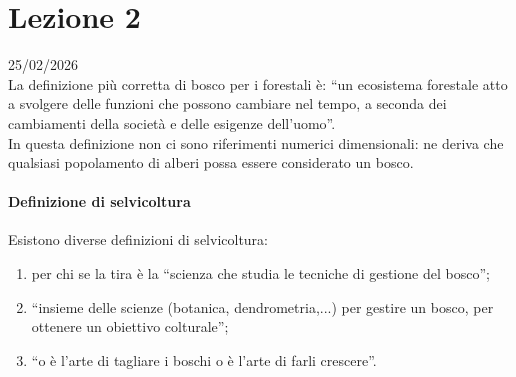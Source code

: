 \section{Lezione 2} \hfill 25/02/2026\\
La definizione più corretta di bosco per i forestali è: ``un ecosistema forestale atto a svolgere delle funzioni che possono cambiare nel tempo, a seconda dei cambiamenti della società e delle esigenze dell'uomo''.\\
In questa definizione non ci sono riferimenti numerici dimensionali: ne deriva che qualsiasi popolamento di alberi possa essere considerato un bosco.
\paragraph{Definizione di selvicoltura} Esistono diverse definizioni di selvicoltura:
\begin{enumerate}[nosep]
    \item per chi se la tira è la ``scienza che studia le tecniche di gestione del bosco'';
    \item ``insieme delle scienze (botanica, dendrometria,...) per gestire un bosco, per ottenere un obiettivo colturale'';
    \item ``o è l'arte di tagliare i boschi o è l'arte di farli crescere''.
\end{enumerate}
